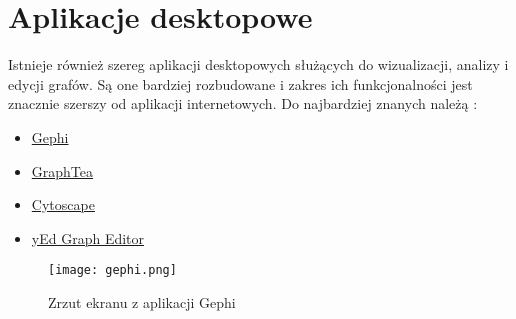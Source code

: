 \section{Aplikacje desktopowe}

Istnieje również szereg aplikacji desktopowych służących do wizualizacji, analizy i edycji grafów. Są one bardziej rozbudowane i zakres ich funkcjonalności jest znacznie szerszy od aplikacji internetowych. Do najbardziej znanych należą \cite{mathex-desktop}:

\begin{itemize}
\setlength\itemsep{0em}
\item \href{https://gephi.org/}{Gephi}
\item \href{http://www.graphtheorysoftware.com/}{GraphTea}
\item \href{http://www.cytoscape.org/}{Cytoscape}
\item \href{https://www.yworks.com}{yEd Graph Editor}
\end{itemize}

\begin{figure}[H]
\caption{Zrzut ekranu z aplikacji Gephi}
\centering
\texttt{[image: gephi.png]}
\end{figure}
